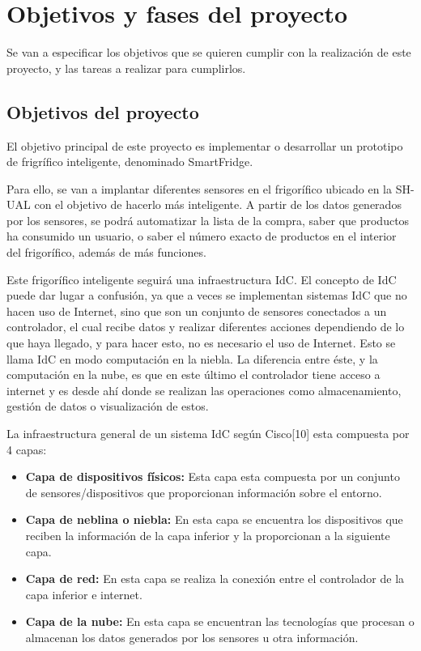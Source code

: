 \chapter{Objetivos y fases del proyecto}
Se van a especificar los objetivos que se quieren cumplir con la realización de este proyecto, y las tareas a realizar para cumplirlos.

\section{Objetivos del proyecto}

El objetivo principal de este proyecto es implementar o desarrollar un prototipo de frigrífico inteligente, denominado SmartFridge. 

Para ello, se van a implantar diferentes sensores en el frigorífico ubicado en la SH-UAL con el objetivo de hacerlo más inteligente. A partir de los datos generados por los sensores, se podrá automatizar la lista de la compra, saber que productos ha consumido un usuario, o saber el número exacto de productos en el interior del frigorífico, además de más funciones.

Este frigorífico inteligente seguirá una infraestructura IdC. El concepto de IdC puede dar lugar a confusión, ya que a veces se implementan sistemas IdC que no hacen uso de Internet, sino que son un conjunto de sensores conectados a un controlador, el cual recibe datos y realizar diferentes acciones dependiendo de lo que haya llegado, y para hacer esto, no es necesario el uso de Internet. Esto se llama IdC en modo computación en la niebla. La diferencia entre éste, y la computación en la nube, es que en este último el controlador tiene acceso a internet y es desde ahí donde se realizan las operaciones como almacenamiento, gestión de datos o visualización de estos.

La infraestructura general de un sistema IdC según Cisco[10] esta compuesta por 4 capas:

\begin{itemize}
    \item \textbf{Capa de dispositivos físicos:} Esta capa esta compuesta por un conjunto de sensores/dispositivos que proporcionan información sobre el entorno.
    \item \textbf{Capa de neblina o niebla:} En esta capa se encuentra los dispositivos que reciben la información de la capa inferior y la proporcionan a la siguiente capa.
    \item \textbf{Capa de red:} En esta capa se realiza la conexión entre el controlador de la capa inferior e internet.
    \item \textbf{Capa de la nube:} En esta capa se encuentran las tecnologías que procesan o almacenan los datos generados por los sensores u otra información.
\end{itemize}

